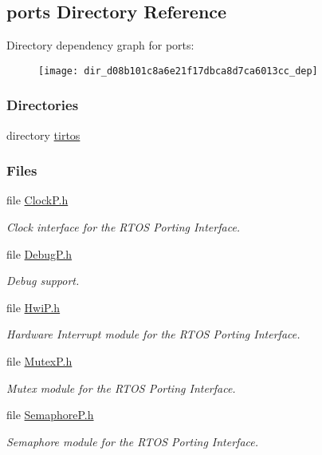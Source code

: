 \subsection{ports Directory Reference}
\label{dir_d08b101c8a6e21f17dbca8d7ca6013cc}
Directory dependency graph for ports\+:
\nopagebreak
\begin{figure}[H]
\begin{center}
\leavevmode
\texttt{[image: dir\_d08b101c8a6e21f17dbca8d7ca6013cc\_dep]}
\end{center}
\end{figure}
\subsubsection*{Directories}
\begin{DoxyCompactItemize}
\item 
directory \hyperlink{dir_cba01f32a00ad5300529588dbbcaa5de}{tirtos}
\end{DoxyCompactItemize}
\subsubsection*{Files}
\begin{DoxyCompactItemize}
\item 
file \hyperlink{_clock_p_8h}{Clock\+P.\+h}
\begin{DoxyCompactList}\small\item\em Clock interface for the R\+T\+O\+S Porting Interface. \end{DoxyCompactList}\item 
file \hyperlink{_debug_p_8h}{Debug\+P.\+h}
\begin{DoxyCompactList}\small\item\em Debug support. \end{DoxyCompactList}\item 
file \hyperlink{_hwi_p_8h}{Hwi\+P.\+h}
\begin{DoxyCompactList}\small\item\em Hardware Interrupt module for the R\+T\+O\+S Porting Interface. \end{DoxyCompactList}\item 
file \hyperlink{_mutex_p_8h}{Mutex\+P.\+h}
\begin{DoxyCompactList}\small\item\em Mutex module for the R\+T\+O\+S Porting Interface. \end{DoxyCompactList}\item 
file \hyperlink{_semaphore_p_8h}{Semaphore\+P.\+h}
\begin{DoxyCompactList}\small\item\em Semaphore module for the R\+T\+O\+S Porting Interface. \end{DoxyCompactList}\end{DoxyCompactItemize}
